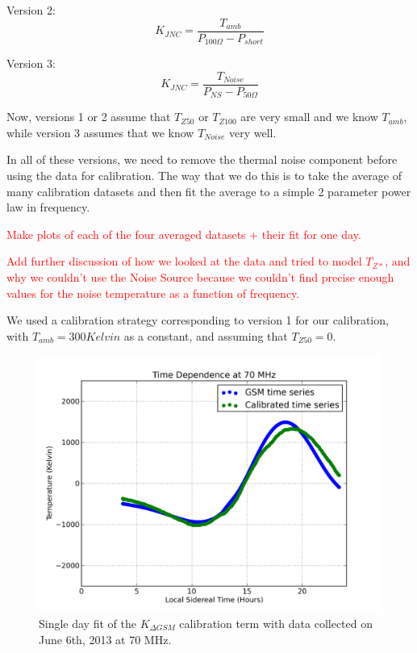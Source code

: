 Version 2:
\begin{equation}
K_{JNC} = \frac{T_{amb}}{P_{100 \Omega} - P_{short}}
\end{equation}

Version 3:
\begin{equation}
K_{JNC} = \frac{T_{Noise}}{P_{NS}-P_{50 \Omega}}
\end{equation}

Now, versions 1 or 2 assume that $T_{Z50}$ or $T_{Z100}$ are very small and we know $T_{amb}$, while version 3 assumes that we know $T_{Noise}$ very well.

In all of these versions, we need to remove the thermal noise component before using the data for calibration. The way that we do this is to take the average of many calibration datasets and then fit the average to a simple 2 parameter power law in frequency. 

\textcolor{red}{Make plots of each of the four averaged datasets + their fit for one day.}

\textcolor{red}{Add further discussion of how we looked at the data and tried to model $T_{Z*}$, and why we couldn't use the Noise Source because we couldn't find precise enough values for the noise temperature as a function of frequency.}

We used a calibration strategy corresponding to version 1 for our calibration, with $T_{amb} = 300 Kelvin$ as a constant, and assuming that $T_{Z50}=0$. 

\begin{figure}[htb]
\begin{center}
\includegraphics[width=0.95\linewidth]{Data_analysis/figures/June_06_K_dgsm_time_series.png}
\caption{Single day fit of the $K_{\Delta GSM}$ calibration term with data collected on June 6th, 2013 at 70 MHz. }
\label{Fig:Kdgsm}
\end{center}
\end{figure}

